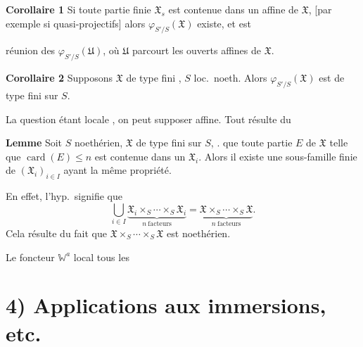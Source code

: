 \documentclass[11pt,a4paper]{article}
\begin{document}

\textbf{Corollaire 1} Si toute partie \struck{\ill{}} finie
 $\mathfrak{X}_s$ est contenue dans un 
affine de $\mathfrak{X}$, \struck{\ill{}} [par
exemple si \struck{\ill{}}  
quasi-projectifs] alors $\varphi_{S'/S}(\mathfrak{X})$ existe,
et est

réunion des $\varphi_{S'/S}(\mathfrak{U})$, où $\mathfrak{U}$
parcourt les ouverts affines de $\mathfrak{X}$.

\textbf{Corollaire 2} Supposons 
 $\mathfrak{X}$ de type
fini , \uncertain{\ill{}} $S$ loc.\ noeth. Alors
$\varphi_{S'/S}(\mathfrak{X})$ est de type fini sur $S$.

La question étant locale , on peut supposer 
affine. Tout résulte du

\textbf{Lemme} Soit $S$ noethérien, $\mathfrak{X}$ de type fini
sur $S$, \ill{} \ill{} \ill{}.   que
toute partie  $E$ de $\mathfrak{X}$ telle que $\operatorname{card}(E) \le n$
est contenue dans un  \struck{\ill{}} $\mathfrak{X}_i$. Alors il
existe une sous-famille finie de $(\mathfrak{X}_i)_{i \in I}$ ayant la
même propriété.

En effet, l'hyp.\ signifie que
\[
  \bigcup_{i \in I} \underbrace{\mathfrak{X}_i \times_S \cdots \times_S
  \mathfrak{X}_i}_{n\ \text{facteurs}}
  = \underbrace{\mathfrak{X} \times_S \cdots \times_S \mathfrak{X}}_{n\
  \text{facteurs}} .
\]
Cela résulte  du fait que
$\mathfrak{X} \times_S \cdots \times_S \mathfrak{X}$ est 
noethérien.

\struck{\ill{}} Le foncteur $\mathbb{W}^{a}$ \ill{} \ill{} local  tous les
\ill{} \ill{} \ill{} \ill{} \ill{} \ill{}

\section{4) Applications aux immersions, etc.}
\end{document}
